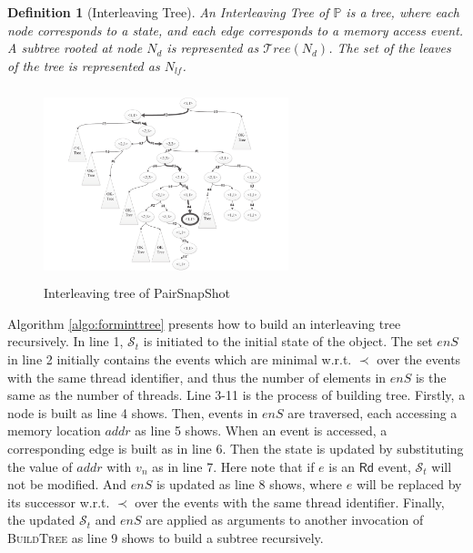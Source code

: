 \documentclass[runningheads]{llncs}
\newcommand{\eread}{\mathsf{Rd}}
\newtheorem{myDef}{Definition}
\begin{document}
\begin{myDef}[Interleaving Tree]
    An \textit{Interleaving Tree} of $\mathbb{P}$ is a tree, where each node corresponds to a state, and each edge corresponds to a memory access event. A subtree rooted at node $N_d$ is represented as $\mathcal{T}ree(N_d)$. The set of the leaves of the tree is represented as $N_{lf}$.
\end{myDef}

\begin{figure}
\centering
\vspace{-0.2cm}
\includegraphics[height = 2.2in, width = 2.8in]{pssinttree.pdf}
\vspace{-0.2cm}
\caption{Interleaving tree of PairSnapShot}\label{fig:interleavingtreeofpairsnapshot}
\end{figure}

    Algorithm \ref{algo:forminttree} presents how to build an interleaving tree recursively. In line 1, $\mathcal{S}_t$ is initiated to the initial state of the object. The set $\mathit{enS}$ in line 2 initially contains the events which are minimal w.r.t. $\prec$ over the events with the same thread identifier, and thus the number of elements in $\mathit{enS}$ is the same as the number of threads. Line 3-11 is the process of building tree. Firstly, a node is built as line 4 shows. Then, events in $\mathit{enS}$ are traversed, each accessing a memory location $addr$ as line 5 shows. When an event is accessed, a corresponding edge is built as in line 6. Then the state is updated by substituting the value of $addr$ with $v_n$ as in line 7. Here note that if $e$ is an $\eread$ event, $\mathcal{S}_t$ will not be modified. And $\mathit{enS}$ is updated as line 8 shows, where $e$ will be replaced by its successor w.r.t. $\prec$ over the events with the same thread identifier. Finally, the updated $\mathcal{S}_t$ and $\mathit{enS}$ are applied as arguments to another invocation of \textsc{BuildTree} as line 9 shows to build a subtree recursively.
\end{document}
